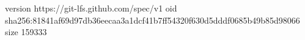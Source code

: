 version https://git-lfs.github.com/spec/v1
oid sha256:81841af69d97db36eecaa3a1dcf41b7ff54320f630d5dddf0685b49b85d98066
size 159333
